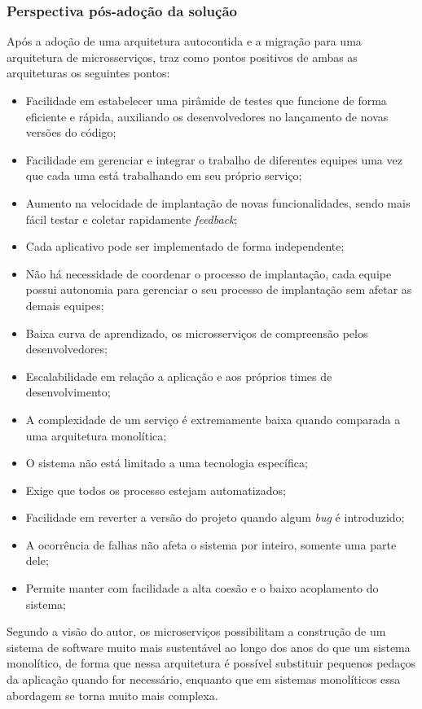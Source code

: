 \subsubsection{Perspectiva pós-adoção da solução}

Após a adoção de uma arquitetura autocontida e a migração para uma arquitetura de microsserviços,
 traz como pontos positivos de ambas as arquiteturas os
seguintes pontos:

\begin{itemize}
    \item Facilidade em estabelecer uma pirâmide de testes que funcione de forma eficiente e rápida,
        auxiliando os desenvolvedores no lançamento de novas versões do código;
    \item Facilidade em gerenciar e integrar o trabalho de diferentes equipes uma vez que cada uma
        está trabalhando em seu próprio serviço;
    \item Aumento na velocidade de implantação de novas funcionalidades, sendo mais fácil testar e
        coletar rapidamente \textit{feedback};
    \item Cada aplicativo pode ser implementado de forma independente;
    \item Não há necessidade de coordenar o processo de implantação, cada equipe possui autonomia
        para gerenciar o seu processo de implantação sem afetar as demais equipes;
    \item Baixa curva de aprendizado, os microsserviços de compreensão pelos desenvolvedores;
    \item Escalabilidade em relação a aplicação e aos próprios times de desenvolvimento;
    \item A complexidade de um serviço é extremamente baixa quando comparada a uma arquitetura
        monolítica;
    \item O sistema não está limitado a uma tecnologia específica;
    \item Exige que todos os processo estejam automatizados;
    \item Facilidade em reverter a versão do projeto quando algum \textit{bug} é introduzido;
    \item A ocorrência de falhas não afeta o sistema por inteiro, somente uma parte dele;
    \item Permite manter com facilidade a alta coesão e o baixo acoplamento do sistema;
\end{itemize}

Segundo a visão do autor, os microserviços possibilitam a construção de um sistema de software muito
mais sustentável ao longo dos anos do que um sistema monolítico, de forma que nessa arquitetura é
possível substituir pequenos pedaços da aplicação quando for necessário, enquanto que em sistemas
monolíticos essa abordagem se torna muito mais complexa.

